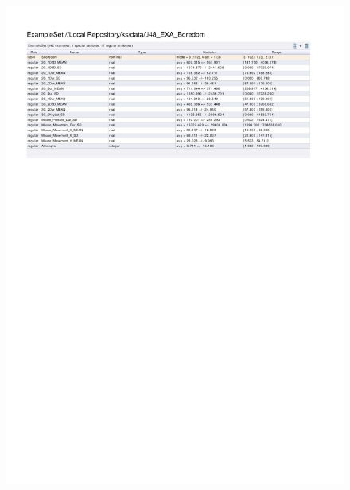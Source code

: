 \begin{figure}[htp]
  \centerline{\includegraphics[trim=0 580 0 60,clip,width=16.09cm]{results/J48_EXA_Boredom.pdf}} \caption{
} \label{J48_EXA_Boredom}
\end{figure}

